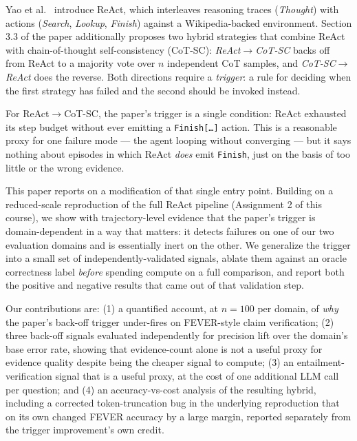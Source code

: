 Yao et al.~\cite{yao2023react} introduce ReAct, which interleaves reasoning
traces (\emph{Thought}) with actions (\emph{Search}, \emph{Lookup},
\emph{Finish}) against a Wikipedia-backed environment. Section 3.3 of the
paper additionally proposes two hybrid strategies that combine ReAct with
chain-of-thought self-consistency (CoT-SC): \emph{ReAct$\to$CoT-SC} backs off
from ReAct to a majority vote over $n$ independent CoT samples, and
\emph{CoT-SC$\to$ReAct} does the reverse. Both directions require a
\emph{trigger}: a rule for deciding when the first strategy has failed and
the second should be invoked instead.

For ReAct$\to$CoT-SC, the paper's trigger is a single condition: ReAct
exhausted its step budget without ever emitting a \texttt{Finish[\ldots]}
action. This is a reasonable proxy for one failure mode --- the agent
looping without converging --- but it says nothing about episodes in which
ReAct \emph{does} emit \texttt{Finish}, just on the basis of too little or
the wrong evidence.

This paper reports on a modification of that single entry point. Building
on a reduced-scale reproduction of the full ReAct pipeline (Assignment 2 of
this course), we show with trajectory-level evidence that the paper's
trigger is domain-dependent in a way that matters: it detects failures on
one of our two evaluation domains and is essentially inert on the other.
We generalize the trigger into a small set of independently-validated
signals, ablate them against an oracle correctness label \emph{before}
spending compute on a full comparison, and report both the positive and
negative results that came out of that validation step.

Our contributions are: (1) a quantified account, at $n=100$ per domain, of
\emph{why} the paper's back-off trigger under-fires on FEVER-style
claim verification; (2) three back-off signals evaluated independently
for precision lift over the domain's base error rate, showing that
evidence-count alone is not a useful proxy for evidence quality despite
being the cheaper signal to compute; (3) an entailment-verification signal
that is a useful proxy, at the cost of one additional LLM call per
question; and (4) an accuracy-vs-cost analysis of the resulting hybrid,
including a corrected token-truncation bug in the underlying reproduction
that on its own changed FEVER accuracy by a large margin, reported
separately from the trigger improvement's own credit.
